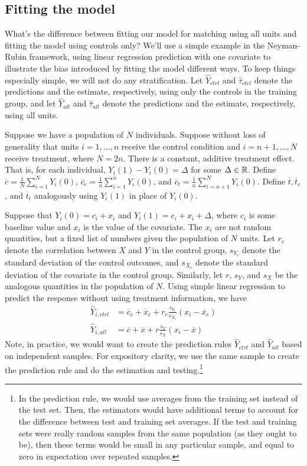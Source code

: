 
\subsection{Fitting the model}\label{fitting_method}
What's the difference between fitting our model for matching using all units and fitting the model using controls only?  
We'll use a simple example in the Neyman-Rubin framework, using linear regression prediction with one covariate to illustrate the bias introduced by fitting the model different ways.
To keep things especially simple, we will not do any stratification.
Let $\hat{Y}_{ctrl}$ and $\hat{\tau}_{ctrl}$ denote the predictions and the estimate, respectively, using only the controls in the training group, and let $\hat{Y}_{all}$ and $\hat{\tau}_{all}$ denote the predictions and the estimate, respectively, using all units.

Suppose we have a population of $N$ individuals.  
Suppose without loss of generality that units $i=1,\dots, n$ receive the control condition and $i = n+1,\dots, N$ receive treatment, where $N = 2n$.  
There is a constant, additive treatment effect.  
That is, for each individual, $Y_i(1) - Y_i(0) = \Delta$ for some $\Delta \in \mathbb{R}$.  
Define $\overline{c} = \frac{1}{N}\sum_{i=1}^N Y_i(0)$, 
$\overline{c}_c = \frac{1}{n}\sum_{i=1}^n Y_i(0)$, and 
$\overline{c}_t = \frac{1}{n}\sum_{i=n+1}^N Y_i(0)$.  
Define $\overline{t}, \overline{t}_c$, and $\overline{t}_t$ analogously using $Y_i(1)$ in place of $Y_i(0)$.

Suppose that $Y_i(0) = c_i + x_i$ and $Y_i(1) = c_i+x_i + \Delta$, 
where $c_i$ is some baseline value and $x_i$ is the value of the covariate.  
The $x_i$ are not random quantities, but a fixed list of numbers given the population of $N$ units.  
Let $r_c$ denote the correlation between $X$ and $Y$ in the control group, 
$s_{Y_c}$ denote the standard deviation of the control outcomes, and 
$s_{X_c}$ denote the standard deviation of the covariate in the control group.  
Similarly, let $r$, $s_Y$, and $s_X$ be the analogous quantities in the population of $N$.  
Using simple linear regression to predict the response without using treatment information, we have
\begin{align*}
\hat{Y}_{i, ctrl} &= \overline{c}_c + \overline{x}_c + r_c \frac{s_{Y_c}}{s_{X_c}}(x_i - \overline{x}_c) \\
\hat{Y}_{i, all} &= \overline{c} + \overline{x} + r\frac{s_Y}{s_X}(x_i - \overline{x})
\end{align*}
\noindent Note, in practice, we would want to create the prediction rules $\hat{Y}_{ctrl}$ and $\hat{Y}_{all}$ based on independent samples.
For expository clarity, we use the same sample to create the prediction rule and do the estimation and testing.\footnote{
In the prediction rule, we would use averages from the training set instead of the test set.
Then, the estimators would have additional terms to account for the difference between test and training set averages.
If the test and training sets were really random samples from the same population (as they ought to be), then these terms would be small in any particular sample, and equal to zero in expectation over repeated samples.
}

